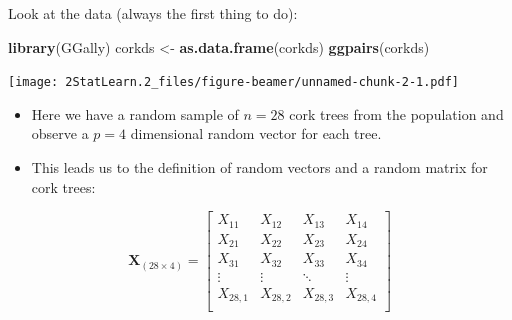 \documentclass[
  ignorenonframetext,
]{beamer}
\newenvironment{Shaded}{\begin{snugshade}}{\end{snugshade}}
\newcommand{\FunctionTok}[1]{\textcolor[rgb]{0.13,0.29,0.53}{\textbf{#1}}}
\newcommand{\NormalTok}[1]{#1}
\newcommand{\OtherTok}[1]{\textcolor[rgb]{0.56,0.35,0.01}{#1}}
\begin{document}
\begin{frame}[fragile]
Look at the data (always the first thing to do):

\tiny

\begin{Shaded}
\begin{Highlighting}[]
\FunctionTok{library}\NormalTok{(GGally)}
\NormalTok{corkds }\OtherTok{\textless{}{-}} \FunctionTok{as.data.frame}\NormalTok{(corkds)}
\FunctionTok{ggpairs}\NormalTok{(corkds)}
\end{Highlighting}
\end{Shaded}

\texttt{[image: 2StatLearn.2\_files/figure-beamer/unnamed-chunk-2-1.pdf]}
\end{frame}

\begin{frame}
\begin{itemize}
\item
  Here we have a random sample of \(n=28\) cork trees from the
  population and observe a \(p=4\) dimensional random vector for each
  tree.
\item
  This leads us to the definition of random vectors and a random matrix
  for cork trees:
\end{itemize}

\[\boldsymbol{X}_{(28 \times 4)}=\left[ \begin{array}{cccc}X_{11} & X_{12} & X_{13}& X_{14}\\ X_{21} & X_{22} & X_{23}& X_{24}\\ X_{31} & X_{32} & X_{33}& X_{34}\\ \vdots & \vdots & \ddots & \vdots\\ X_{28,1} & X_{28,2} & X_{28,3}& X_{28,4}\\ \end{array} \right]\]
\end{frame}
\end{document}
